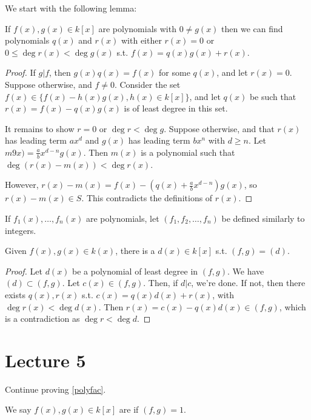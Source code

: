 \documentclass{article}
\begin{document}
We start with the following lemma: 

\begin{lemma}
    If $f(x), g(x) \in k[x]$ are polynomials with $0 \neq g(x)$ then we can find polynomials $q(x)$ and $r(x)$ with either $r(x) = 0$ or $0 \leq \deg r(x) < \deg g(x)$ s.t. $f(x) = q(x)g(x) + r(x)$.
\end{lemma}

\begin{proof}
    If $g|f$, then $g(x)q(x) = f(x)$ for some $q(x)$, and let $r(x) = 0$. Suppose otherwise, and $f \neq 0$. Consider the set $f(x) \in \{f(x) - h(x)g(x), h(x) \in k[x]\}$, and let $q(x)$ be such that $r(x) = f(x) - q(x)g(x)$ is of least degree in this set. 

    It remains to show $r = 0$ or $\deg r < \deg g$. Suppose otherwise, and that $r(x)$ has leading term $ax^d$ and $g(x)$ has leading term $bx^n$ with $d \geq n$. Let $m9x) = \frac{a}{b} x^{d - n} g(x)$. Then $m(x)$ is a polynomial such that $\deg(r(x) - m(x)) < \deg r(x)$. 

    However, $r(x) - m(x) = f(x) - (q(x) + \frac{a}{b} x^{d - n}) g(x)$, so $r(x) - m(x) \in S$. This contradicts the definitions of $r(x)$.
\end{proof}

\begin{definition}
    If $f_1(x), \ldots, f_n(x)$ are polynomials, let $(f_1, f_2, \ldots, f_n)$ be defined similarly to integers.
\end{definition}

\begin{lemma}
    Given $f(x), g(x) \in k(x)$, there is a $d(x) \in k[x]$ s.t. $(f, g) = (d)$. 
\end{lemma}

\begin{proof}
    Let $d(x)$ be a polynomial of least degree in $(f, g)$. We have $(d) \subset (f, g)$. Let $c(x) \in (f, g)$. Then, if $d \vert c$, we're done. If not, then there exists $q(x), r(x)$ s.t. $c(x) = q(x)d(x) + r(x)$, with $\deg r(x) < \deg d(x)$. Then $r(x) = c(x) - q(x)d(x) \in (f, g)$, which is a contradiction as $\deg r < \deg d$. 
\end{proof}

\section{Lecture 5}
Continue proving \ref{polyfac}.

\begin{definition}
    We say $f(x), g(x) \in k[x]$ are  if $(f, g) = 1$.
\end{definition}
\end{document}
